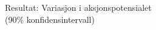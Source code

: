 \documentclass[presentation]{beamer}
\begin{document}
\begin{frame}{Resultat: Variasjon i aksjonspotensialet \\(90\% konfidensintervall)}
   \vspace{-5mm}
\begin{figure}
\end{figure}
\end{frame}
\end{document}
